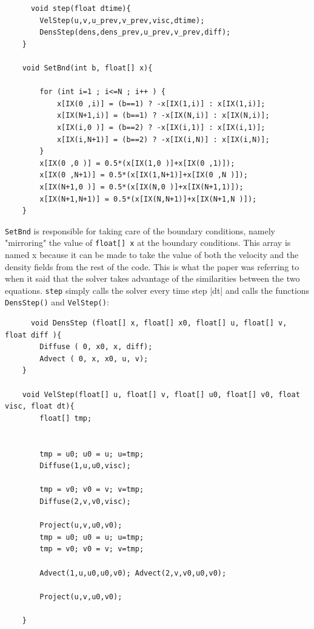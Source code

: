 \documentclass[12pt,a4paper]{book}
\begin{document}
\begin{lstlisting}
	  void step(float dtime){
		VelStep(u,v,u_prev,v_prev,visc,dtime);
		DensStep(dens,dens_prev,u_prev,v_prev,diff);
	}
	
	void SetBnd(int b, float[] x){
		
		for (int i=1 ; i<=N ; i++ ) {
			x[IX(0 ,i)] = (b==1) ? -x[IX(1,i)] : x[IX(1,i)];
			x[IX(N+1,i)] = (b==1) ? -x[IX(N,i)] : x[IX(N,i)];
			x[IX(i,0 )] = (b==2) ? -x[IX(i,1)] : x[IX(i,1)];
			x[IX(i,N+1)] = (b==2) ? -x[IX(i,N)] : x[IX(i,N)];
		}
		x[IX(0 ,0 )] = 0.5*(x[IX(1,0 )]+x[IX(0 ,1)]);
		x[IX(0 ,N+1)] = 0.5*(x[IX(1,N+1)]+x[IX(0 ,N )]);
		x[IX(N+1,0 )] = 0.5*(x[IX(N,0 )]+x[IX(N+1,1)]);
		x[IX(N+1,N+1)] = 0.5*(x[IX(N,N+1)]+x[IX(N+1,N )]);
	}
\end{lstlisting} 
\verb|SetBnd| is responsible for taking care of the boundary conditions, namely "mirroring" the value of \verb|float[] x| at the boundary conditions. This array is named x because it can be made to take the value of both the velocity and the density fields from the rest of the code. This is what the paper\cite{josrtfdg} was referring to when it said that the solver takes advantage of the similarities between the two equations. \verb|step| simply calls the solver every time step |dt| and calls the functions \verb|DensStep()| and \verb|VelStep()|:
\begin{lstlisting}
	  void DensStep (float[] x, float[] x0, float[] u, float[] v, float diff ){
		Diffuse ( 0, x0, x, diff);
		Advect ( 0, x, x0, u, v);
	}
	
	void VelStep(float[] u, float[] v, float[] u0, float[] v0, float visc, float dt){
		float[] tmp;
		
		
		tmp = u0; u0 = u; u=tmp;
		Diffuse(1,u,u0,visc);
		
		tmp = v0; v0 = v; v=tmp;
		Diffuse(2,v,v0,visc);
		
		Project(u,v,u0,v0);
		tmp = u0; u0 = u; u=tmp;
		tmp = v0; v0 = v; v=tmp;
		
		Advect(1,u,u0,u0,v0); Advect(2,v,v0,u0,v0);
		
		Project(u,v,u0,v0);
		
	}

\end{lstlisting}
\end{document}
